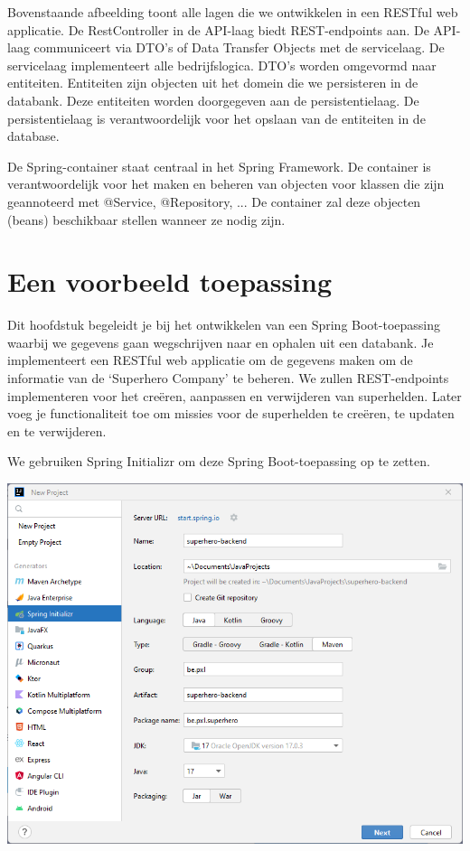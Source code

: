 Bovenstaande afbeelding toont alle lagen die we ontwikkelen in een RESTful web applicatie. De RestController in de API-laag biedt REST-endpoints aan. De API-laag communiceert via DTO's of Data Transfer Objects met de servicelaag. De servicelaag implementeert alle bedrijfslogica. DTO's worden omgevormd naar entiteiten.  Entiteiten zijn  objecten uit het domein die we persisteren in de databank.  Deze entiteiten worden  doorgegeven aan de persistentielaag. De persistentielaag is verantwoordelijk voor het opslaan van de entiteiten in de database.

De Spring-container staat centraal in het Spring Framework. De container is verantwoordelijk voor het maken en beheren van objecten voor klassen die zijn geannoteerd met @Service, @Repository, ... De container zal deze objecten (beans) beschikbaar stellen wanneer ze nodig zijn.


\section{Een voorbeeld toepassing}

Dit hoofdstuk begeleidt je bij het ontwikkelen van een Spring Boot-toepassing waarbij we gegevens gaan wegschrijven naar en ophalen uit een databank. Je implementeert een RESTful web applicatie om de gegevens  maken om de informatie van de `Superhero Company' te beheren.  We zullen REST-endpoints implementeren voor het creëren,  aanpassen en verwijderen van superhelden. Later voeg je functionaliteit toe om missies voor de superhelden te creëren,  te updaten en te verwijderen. 

We gebruiken Spring Initializr om deze Spring Boot-toepassing op te zetten.

\includegraphics[width=\textwidth]{./images/chapter2/new_project.png} 

